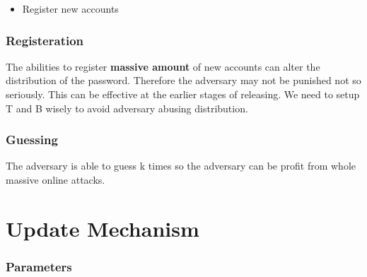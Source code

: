 \documentclass[]{article}
\begin{document}
\begin{itemize}
	\item Register new accounts
\end{itemize}

\subsubsection{Registeration}
The abilities to register \textbf{massive amount} of new accounts can alter the distribution of the password. Therefore the adversary may not be punished not so seriously. This can be effective at the earlier stages of releasing. We need to setup T and B wisely to avoid adversary abusing distribution.

\subsubsection{Guessing}
The adversary is able to guess k times so the adversary can be profit from whole massive online attacks. 	
\section{Update Mechanism}
\subsubsection{Parameters}
\end{document}

